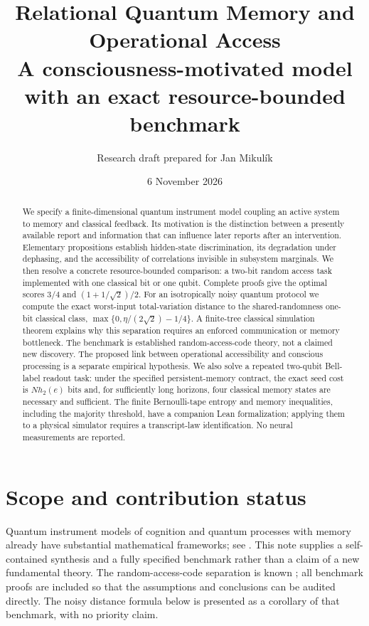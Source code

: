 \documentclass[11pt,a4paper]{article}
\title{Relational Quantum Memory and Operational Access\\
\large A consciousness-motivated model with an exact resource-bounded benchmark}
\author{Research draft prepared for Jan Mikul\'{i}k}
\date{6 November 2026}
\theoremstyle{definition}
\begin{document}
\maketitle
\begin{abstract}
We specify a finite-dimensional quantum instrument model coupling an active system to memory and classical feedback. Its motivation is the distinction between a presently available report and information that can influence later reports after an intervention. Elementary propositions establish hidden-state discrimination, its degradation under dephasing, and the accessibility of correlations invisible in subsystem marginals. We then resolve a concrete resource-bounded comparison: a two-bit random access task implemented with one classical bit or one qubit. Complete proofs give the optimal scores $3/4$ and $(1+1/\sqrt2)/2$. For an isotropically noisy quantum protocol we compute the exact worst-input total-variation distance to the shared-randomness one-bit classical class, $\max\{0,\eta/(2\sqrt2)-1/4\}$. A finite-tree classical simulation theorem explains why this separation requires an enforced communication or memory bottleneck. The benchmark is established random-access-code theory, not a claimed new discovery. The proposed link between operational accessibility and conscious processing is a separate empirical hypothesis. We also solve a repeated two-qubit Bell-label readout task: under the specified persistent-memory contract, the exact seed cost is $Nh_2(e)$ bits and, for sufficiently long horizons, four classical memory states are necessary and sufficient. The finite Bernoulli-tape entropy and memory inequalities, including the majority threshold, have a companion Lean formalization; applying them to a physical simulator requires a transcript-law identification. No neural measurements are reported.
\end{abstract}

\section{Scope and contribution status}
Quantum instrument models of cognition and quantum processes with memory already have substantial mathematical frameworks; see \cite{tull,pollock}. This note supplies a self-contained synthesis and a fully specified benchmark rather than a claim of a new fundamental theory. The random-access-code separation is known \cite{qrac}; all benchmark proofs are included so that the assumptions and conclusions can be audited directly. The noisy distance formula below is presented as a corollary of that benchmark, with no priority claim.
\end{document}
